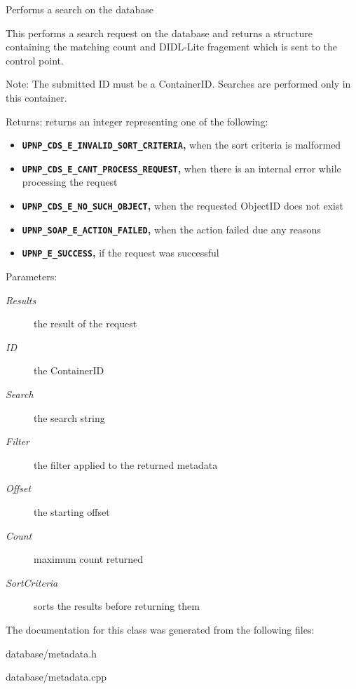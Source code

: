 Performs a search on the database

This performs a search request on the database and returns a structure containing the matching count and DIDL-Lite fragement which is sent to the control point.

\begin{Desc}
\item[Note:]The submitted ID must be a ContainerID. Searches are performed only in this container.\end{Desc}
\begin{Desc}
\item[Returns:]returns an integer representing one of the following:\begin{itemize}
\item {\bf {\tt UPNP\_\-CDS\_\-E\_\-INVALID\_\-SORT\_\-CRITERIA},} when the sort criteria is malformed\item {\bf {\tt UPNP\_\-CDS\_\-E\_\-CANT\_\-PROCESS\_\-REQUEST},} when there is an internal error while processing the request\item {\bf {\tt UPNP\_\-CDS\_\-E\_\-NO\_\-SUCH\_\-OBJECT},} when the requested ObjectID does not exist\item {\bf {\tt UPNP\_\-SOAP\_\-E\_\-ACTION\_\-FAILED},} when the action failed due any reasons\item {\bf {\tt UPNP\_\-E\_\-SUCCESS},} if the request was successful \end{itemize}
\end{Desc}
\begin{Desc}
\item[Parameters:]
\begin{description}
\item[{\em Results}]the result of the request \item[{\em ID}]the ContainerID \item[{\em Search}]the search string \item[{\em Filter}]the filter applied to the returned metadata \item[{\em Offset}]the starting offset \item[{\em Count}]maximum count returned \item[{\em SortCriteria}]sorts the results before returning them \end{description}
\end{Desc}


The documentation for this class was generated from the following files:\begin{CompactItemize}
\item 
database/metadata.h\item 
database/metadata.cpp\end{CompactItemize}
